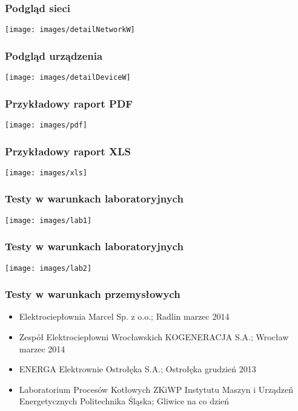 \documentclass[ucs]{beamer}
\begin{document}
\begin{frame}
\frametitle{Podgląd sieci}
\texttt{[image: images/detailNetworkW]}
\end{frame}

\begin{frame}
\frametitle{Podgląd urządzenia}
\texttt{[image: images/detailDeviceW]}
\end{frame}

\begin{frame}
\frametitle{Przykładowy raport PDF}
\begin{center}
\texttt{[image: images/pdf]}
\end{center}
\end{frame}

\begin{frame}
\frametitle{Przykładowy raport XLS}
\begin{center}
\texttt{[image: images/xls]}
\end{center}
\end{frame}

\begin{frame}
\frametitle{Testy w warunkach laboratoryjnych}
\begin{center}
\texttt{[image: images/lab1]}
\end{center}
\end{frame}

\begin{frame}
\frametitle{Testy w warunkach laboratoryjnych}
\begin{center}
\texttt{[image: images/lab2]}
\end{center}
\end{frame}

\begin{frame}
\frametitle{Testy w warunkach przemysłowych}
\begin{itemize}
\setlength{\itemsep}{5pt}
\setlength{\parskip}{5pt}
\setlength{\parsep}{5pt}
\item Elektrociepłownia Marcel Sp. z o.o.; Radlin marzec 2014
\item Zespół Elektrociepłowni Wrocławskich KOGENERACJA S.A.; Wrocław marzec 2014
\item ENERGA Elektrownie Ostrołęka S.A.; Ostrołęka grudzień 2013
\item Laboratorium Procesów Kotłowych ZKiWP Instytutu Maszyn i Urządzeń Energetycznych Politechnika Śląska; Gliwice na co dzień
\end{itemize}
\end{frame}
\end{document}
